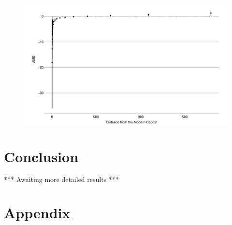 \documentclass[12pt]{article}
\begin{document}
\begin{figure}[htpb]
	\centering
	\includegraphics[width=\linewidth]{"../R/Output/state_based_int_plot.pdf"}
	\caption{}
	\label{sb_int}
\end{figure}


\section{Conclusion}

*** Awaiting more detailed results ***


\pagebreak




\pagebreak
\section*{Appendix}





\end{document}

